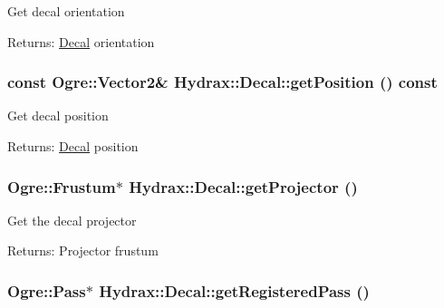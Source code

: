 Get decal orientation \begin{Desc}
\item[Returns:]\hyperlink{class_hydrax_1_1_decal}{Decal} orientation \end{Desc}
\hypertarget{class_hydrax_1_1_decal_56457d138e4d109486eb83194ce05507}{
\subsubsection[{getPosition}]{\setlength{\rightskip}{0pt plus 5cm}const Ogre::Vector2\& Hydrax::Decal::getPosition () const}}
\label{class_hydrax_1_1_decal_56457d138e4d109486eb83194ce05507}


Get decal position \begin{Desc}
\item[Returns:]\hyperlink{class_hydrax_1_1_decal}{Decal} position \end{Desc}
\hypertarget{class_hydrax_1_1_decal_f10c4fe7b59a31e9dea6d44a94b39322}{
\subsubsection[{getProjector}]{\setlength{\rightskip}{0pt plus 5cm}Ogre::Frustum$\ast$ Hydrax::Decal::getProjector ()}}
\label{class_hydrax_1_1_decal_f10c4fe7b59a31e9dea6d44a94b39322}


Get the decal projector \begin{Desc}
\item[Returns:]Projector frustum \end{Desc}
\hypertarget{class_hydrax_1_1_decal_436d4064d3f5e2b84fbc006db82da935}{
\subsubsection[{getRegisteredPass}]{\setlength{\rightskip}{0pt plus 5cm}Ogre::Pass$\ast$ Hydrax::Decal::getRegisteredPass ()}}
\label{class_hydrax_1_1_decal_436d4064d3f5e2b84fbc006db82da935}


